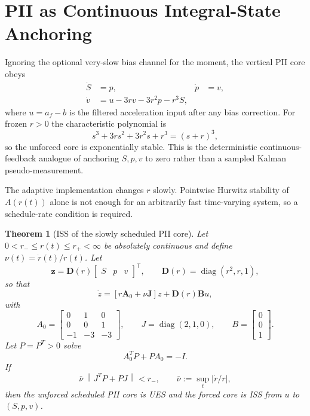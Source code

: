 \documentclass[conference]{IEEEtran}
\DeclareRobustCommand{\vct}[1]{\bm{#1}}
\DeclareRobustCommand{\mat}[1]{\bm{#1}}
\newcommand{\norm}[1]{\left\lVert#1\right\rVert}
\newcommand{\abs}[1]{\left|#1\right|}
\newcommand{\T}{^{\mathsf T}}
\DeclareMathOperator{\diag}{diag}
\newtheorem{theorem}{Theorem}
\theoremstyle{remark}
\begin{document}
\section{PII as Continuous Integral-State Anchoring}
\label{sec:pii}

Ignoring the optional very-slow bias channel for the moment, the vertical PII
core obeys
\begin{align}
 \dot S&=p, & \dot p&=v,\\
 \dot v&=u-3rv-3r^2p-r^3S,
 \label{eq:pii-core}
\end{align}
where $u=a_f-b$ is the filtered acceleration input after any bias correction.
For frozen $r>0$ the characteristic polynomial is
\begin{equation}
 s^3+3rs^2+3r^2s+r^3=(s+r)^3,
 \label{eq:pii-poly}
\end{equation}
so the unforced core is exponentially stable.  This is the deterministic
continuous-feedback analogue of anchoring $S,p,v$ to zero rather than a
sampled Kalman pseudo-measurement.

The adaptive implementation changes $r$ slowly.  Pointwise Hurwitz stability of
$A(r(t))$ alone is not enough for an arbitrarily fast time-varying system, so a
schedule-rate condition is required.

\begin{theorem}[ISS of the slowly scheduled PII core]
\label{thm:pii-scheduled}
Let $0<r_-\le r(t)\le r_+<\infty$ be absolutely continuous and define
$\nu(t)=\dot r(t)/r(t)$.  Let
\begin{equation}
 \vct z=\mat D(r)\begin{bmatrix}S&p&v\end{bmatrix}\T,
 \qquad
 \mat D(r)=\diag(r^2,r,1),
 \end{equation}
so that
\begin{equation}
 \dot z=
 \left[r\mat A_0+\nu\mat J\right]z+\mat D(r)\vct B u,
 \label{eq:pii-scaled}
\end{equation}
with
\begin{equation}
 A_0=\begin{bmatrix}0&1&0\\0&0&1\\-1&-3&-3\end{bmatrix},
 \qquad J=\diag(2,1,0),
 \qquad B=\begin{bmatrix}0\\0\\1\end{bmatrix}.
\end{equation}
Let $P=P^T>0$ solve
\begin{equation}
 A_0^TP+PA_0=-I.
 \end{equation}
If
\begin{equation}
 \bar\nu\,\norm{J^TP+PJ}<r_-,
 \qquad \bar\nu:=\sup_t\abs{\dot r/r},
 \label{eq:pii-rate-condition}
\end{equation}
then the unforced scheduled PII core is UES and the forced core is ISS from
$u$ to $(S,p,v)$.
\end{theorem}
\end{document}
